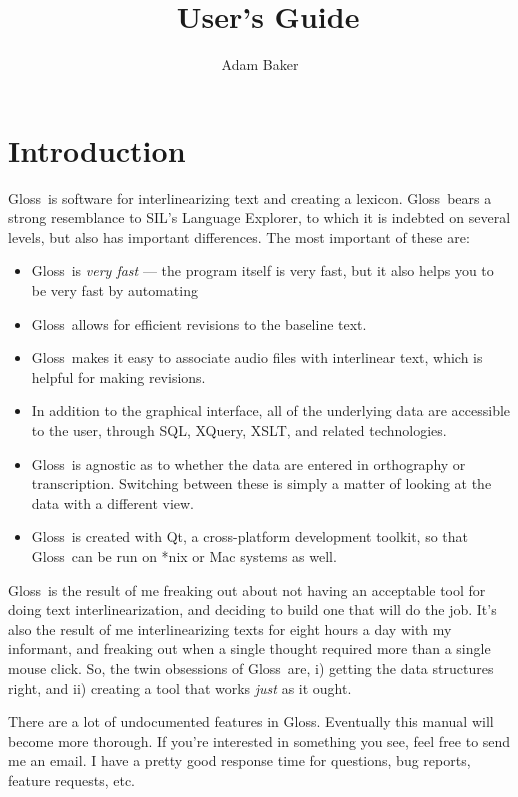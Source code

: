 \documentclass[oneside]{book}
\title{\gloss\ User's Guide}
\author{Adam Baker}
\def\gloss{\textsf{Gloss}}
\begin{document}
\maketitle
\tableofcontents

\chapter{Introduction}
\gloss\ is software for interlinearizing text and creating a lexicon. \gloss\ bears a strong resemblance to SIL's Language Explorer, to which it is indebted on several levels, but also has important differences. The most important of these are:

\begin{itemize}
\item \gloss\ is \emph{very fast} --- the program itself is very fast, but it also helps you to be very fast by automating 
\item \gloss\ allows for efficient revisions to the baseline text.
\item \gloss\ makes it easy to associate audio files with interlinear text, which is helpful for making revisions.
\item In addition to the graphical interface, all of the underlying data are accessible to the user, through SQL, XQuery, XSLT, and related technologies.
\item \gloss\ is agnostic as to whether the data are entered in orthography or transcription. Switching between these is simply a matter of looking at the data with a different view.
\item \gloss\ is created with Qt, a cross-platform development toolkit, so that \gloss\ can be run on *nix or Mac systems as well.
\end{itemize}

\gloss\ is the result of me freaking out about not having an acceptable tool for doing text interlinearization, and deciding to build one that will do the job. It's also the result of me interlinearizing texts for eight hours a day with my informant, and freaking out when a single thought required more than a single mouse click. So, the twin obsessions of \gloss\ are, i) getting the data structures right, and ii) creating a tool that works \emph{just} as it ought.

There are a lot of undocumented features in \gloss. Eventually this manual will become more thorough. If you're interested in something you see, feel free to send me an email. I have a pretty good response time for questions, bug reports, feature requests, etc.
\end{document}

